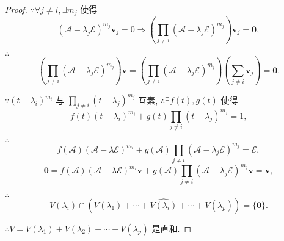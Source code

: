 \documentclass[color=black,device=normal,lang=cn,mode=geye]{elegantnote}
\begin{document}
\begin{proof}
    $\because\forall j\neq i,\exists m_j$ 使得
    \[(\mathcal{A}-\lambda_j\mathcal{E})^{m_j}\boldsymbol{v}_j=0\Rightarrow\left(\prod\limits_{j\neq i}(\mathcal{A}-\lambda_j\mathcal{E})^{m_j}\right)\boldsymbol{v}_j=\boldsymbol{0},\]
    
    $\therefore$
    \[\left(\prod\limits_{j\neq i}(\mathcal{A}-\lambda_j\mathcal{E})^{m_j}\right)\boldsymbol{v}=\left(\prod\limits_{j\neq i}(\mathcal{A}-\lambda_j\mathcal{E})^{m_j}\right)\left(\sum\limits_{j\neq i}\boldsymbol{v}_j\right)=\boldsymbol{0}.\]

    $\because(t-\lambda_i)^{m_i}$ 与 $\prod\limits_{j\neq i}(t-\lambda_j)^{m_j}$ 互素, $\therefore\exists f(t),g(t)$ 使得
    \[f(t)(t-\lambda_i)^{m_i}+g(t)\prod\limits_{j\neq i}(t-\lambda_j)^{m_j}=1,\]

    $\therefore$
    \[f(\mathcal{A})(\mathcal{A}-\lambda\mathcal{E})^{m_i}+g(\mathcal{A})\prod\limits_{j\neq i}(\mathcal{A}-\lambda_j\mathcal{E})^{m_j}=\mathcal{E},\]
    \[\boldsymbol{0}=f(\mathcal{A})(\mathcal{A}-\lambda\mathcal{E})^{m_i}\boldsymbol{v}+g(\mathcal{A})\prod\limits_{j\neq i}(\mathcal{A}-\lambda_j\mathcal{E})^{m_j}\boldsymbol{v}=\boldsymbol{v},\]

    $\therefore$
    \begin{equation}\label{eq4.5}
        V(\lambda_i)\cap(V(\lambda_1)+\cdots+\widehat{V(\lambda_i)}+\cdots+V(\lambda_p))=\{\boldsymbol{0}\}.
    \end{equation}

    $\therefore V=V(\lambda_1)+V(\lambda_2)+\cdots+V(\lambda_p)$ 是直和.
\end{proof}
\end{document}
